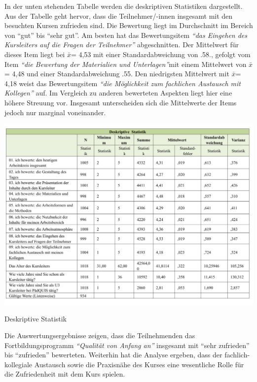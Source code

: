 \documentclass[12pt,a4paper]{article}
\begin{document}
In der unten stehenden Tabelle werden die deskriptiven Statistiken dargestellt. Aus der Tabelle geht hervor, dass die Teilnehmer/-innen insgesamt mit den besuchten Kursen zufrieden sind. Die Bewertung liegt im Durchschnitt im Bereich von "`gut"' bis "`sehr gut"'. Am besten hat das Bewertungsitem \textit{"`das Eingehen des Kursleiters auf die Fragen der Teilnehmer"'} abgeschnitten. Der Mittelwert für dieses Item liegt bei $\bar x$= 4,53 mit einer Standardabweichung von .58., gefolgt vom Item \textit{"`die Bewertung der Materialien und Unterlagen"'}mit einem Mittelwert von $\bar x$= 4,48 und einer Standardabweichung .55. Den niedrigsten Mittelwert mit $\bar x$= 4,18 weist das Bewertungsitem \textit{"`die Mög\-lich\-keit zum fachlichen Austausch mit Kollegen"'} auf. Im Vergleich zu anderen bewerteten Aspekten liegt hier eine höhere Streuung vor. Insgesamt unterscheiden sich die Mittelwerte der Items jedoch nur marginal voneinander. 

\begin{table}[!ht]
\includegraphics[scale=0.54]{tab05.pdf}
\caption{Deskriptive Statistik}
\label{}
\end{table}


Die Auswertungsergebnisse zeigen, dass die Teilnehmenden das Fortbildungsprogramm \textit{"`Qualität von Anfang an"'} insgesamt mit "`sehr zufrieden"' bis "`zufrieden"' bewerteten. Weiterhin hat die Analyse ergeben, dass der fachlich-kollegiale Austausch sowie die Praxisnähe des Kurses eine wesentliche Rolle für die Zufriedenheit mit dem Kurs spielen. 
\end{document}
